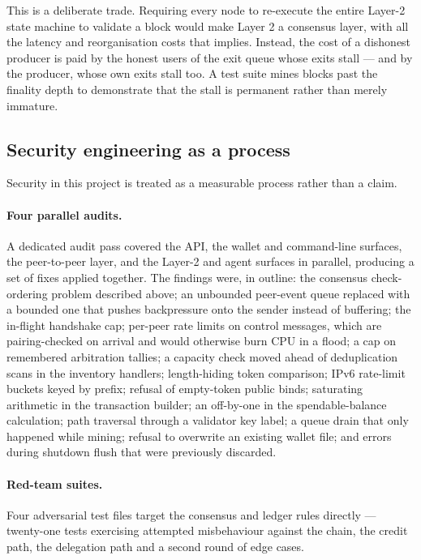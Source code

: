 \documentclass{article}
\begin{document}
This is a deliberate trade. Requiring every node to re-execute the entire
Layer-2 state machine to validate a block would make Layer 2 a consensus
layer, with all the latency and reorganisation costs that implies. Instead, the
cost of a dishonest producer is paid by the honest users of the exit queue
whose exits stall --- and by the producer, whose own exits stall too. A test
suite mines blocks past the finality depth to demonstrate that the stall is
permanent rather than merely immature.

\subsection{Security engineering as a process}
\label{sec:security-process}

Security in this project is treated as a measurable process rather than a
claim.

\paragraph{Four parallel audits.} A dedicated audit pass covered the API, the
wallet and command-line surfaces, the peer-to-peer layer, and the Layer-2 and
agent surfaces in parallel, producing a set of fixes applied together. The
findings were, in outline: the consensus check-ordering problem described
above; an unbounded peer-event queue replaced with a bounded one that pushes
backpressure onto the sender instead of buffering; the in-flight handshake cap;
per-peer rate limits on control messages, which are pairing-checked on arrival
and would otherwise burn CPU in a flood; a cap on remembered arbitration
tallies; a capacity check moved ahead of deduplication scans in the inventory
handlers; length-hiding token comparison; IPv6 rate-limit buckets keyed by
prefix; refusal of empty-token public binds; saturating arithmetic in the
transaction builder; an off-by-one in the spendable-balance calculation; path
traversal through a validator key label; a queue drain that only happened while
mining; refusal to overwrite an existing wallet file; and errors during
shutdown flush that were previously discarded.

\paragraph{Red-team suites.} Four adversarial test files target the consensus
and ledger rules directly --- twenty-one tests exercising attempted
misbehaviour against the chain, the credit path, the delegation path and a
second round of edge cases.
\end{document}
